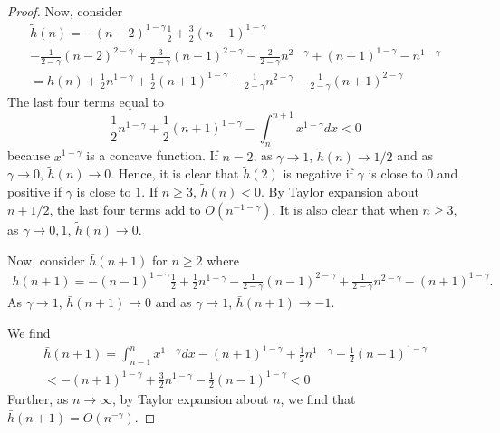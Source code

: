 \documentclass[11pt]{article}
\begin{document}
\begin{proof}
Now, consider
\begin{multline*}
\tilde{h}(n)=-(n-2)^{1-\gamma}\frac{1}{2}+\frac{3}{2}(n-1)^{1-\gamma}\\
-\frac{1}{2-\gamma}(n-2)^{2-\gamma}+\frac{3}{2-\gamma}(n-1)^{2-\gamma}
-\frac{2}{2-\gamma}n^{2-\gamma}+(n+1)^{1-\gamma}-n^{1-\gamma}\\
=h(n)+\frac{1}{2}n^{1-\gamma}+\frac{1}{2}(n+1)^{1-\gamma}
+\frac{1}{2-\gamma}n^{2-\gamma}
-\frac{1}{2-\gamma}(n+1)^{2-\gamma}
\end{multline*}
The last four terms equal to $$
\frac{1}{2}n^{1-\gamma}+\frac{1}{2}(n+1)^{1-\gamma}
-\int_n^{n+1}x^{1-\gamma}dx<0
$$
because $x^{1-\gamma}$ is a concave function. 
If $n=2$, as $\gamma\to 1$, $\tilde{h}(n)\to 1/2$ and as $\gamma\to 0$, $\tilde{h}(n)\to 0$. Hence, it is clear that $\tilde{h}(2)$ is negative if $\gamma$ is close to $0$ and positive if $\gamma$ is close to $1$. 
If $n\ge 3$, $\tilde{h}(n)<0$. By Taylor expansion about $n+1/2$, the last four terms add to $O(n^{-1-\gamma})$. It is also clear that when $n\ge 3$, as $\gamma\to 0,1$, $\tilde{h}(n)\to 0$. 

Now, consider $\bar{h}(n+1)$ for $n\ge 2$ where 
\begin{multline*}
\bar{h}(n+1)
=-(n-1)^{1-\gamma}\frac{1}{2}+\frac{1}{2}n^{1-\gamma}
-\frac{1}{2-\gamma}(n-1)^{2-\gamma}+\frac{1}{2-\gamma}n^{2-\gamma}
-(n+1)^{1-\gamma}.
\end{multline*}
As $\gamma\to 1$, $\bar{h}(n+1)\to 0$ and as $\gamma\to 1$, $\bar{h}(n+1)\to -1$. 

We find 
\begin{multline*}
\bar{h}(n+1)=\int_{n-1}^nx^{1-\gamma}dx-(n+1)^{1-\gamma}+\frac{1}{2}n^{1-\gamma}
-\frac{1}{2}(n-1)^{1-\gamma}\\
<-(n+1)^{1-\gamma}+\frac{3}{2}n^{1-\gamma}-\frac{1}{2}(n-1)^{1-\gamma}<0
\end{multline*}
Further, as $n\to\infty$, by Taylor expansion about $n$, we find that $\bar{h}(n+1)=O(n^{-\gamma})$.


\end{proof}
\end{document}

